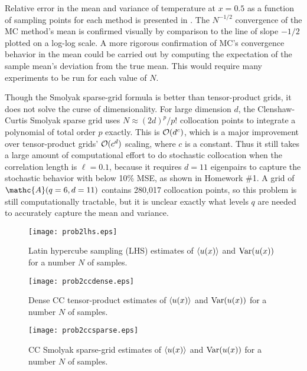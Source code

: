 \documentclass[11pt]{article}
\begin{document}
Relative error in the mean and variance of temperature at $x = 0.5$ as a function of sampling points for each method is presented in . The $N^{-1/2}$ convergence of the MC method's mean is confirmed visually by comparison to the line of slope $-1/2$ plotted on a log-log scale. A more rigorous confirmation of MC's convergence behavior in the mean could be carried out by computing the expectation of the sample mean's deviation from the true mean. This would require many experiments to be run for each value of $N$.

Though the Smolyak sparse-grid formula is better than tensor-product grids, it does not solve the curse of dimensionality. For large dimension $d$, the Clenshaw-Curtis Smolyak sparse grid uses $N \approx (2d)^p/p!$ collocation points to integrate a polynomial of total order $p$ exactly. This is $\mathcal{O}(d^c)$, which is a major improvement over tensor-product grids' $\mathcal{O}(c^d)$ scaling, where $c$ is a constant. Thus it still takes a large amount of computational effort to do stochastic collocation when the correlation length is $\ell = 0.1$, because it requires $d = 11$ eigenpairs to capture the stochastic behavior with below 10\% MSE, as shown in Homework \#1. A grid of $\mathc{A}(q=6,d=11)$ contains 280,017 collocation points, so this problem is still computationally tractable, but it is unclear exactly what levels $q$ are needed to accurately capture the mean and variance.

\begin{figure}[h]
\centering
\texttt{[image: prob2lhs.eps]}
\\[2ex]
\caption{Latin hypercube sampling (LHS) estimates of $\left\langle u(x) \right\rangle$ and $\operatorname{Var}(u(x))$ for a number $N$ of samples.}
\label{fig:prob2_lhs}
\end{figure}

\begin{figure}[h]
\centering
\texttt{[image: prob2ccdense.eps]}
\\[2ex]
\caption{Dense CC tensor-product estimates of $\left\langle u(x) \right\rangle$ and $\operatorname{Var}(u(x))$ for a number $N$ of samples.}
\label{fig:prob2_dense}
\end{figure}

\begin{figure}[h]
\centering
\texttt{[image: prob2ccsparse.eps]}
\\[2ex]
\caption{CC Smolyak sparse-grid estimates of $\left\langle u(x) \right\rangle$ and $\operatorname{Var}(u(x))$ for a number $N$ of samples.}
\label{fig:prob2_sparse}
\end{figure}
\end{document}
